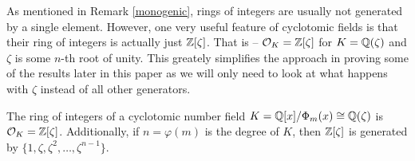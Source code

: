 As mentioned in Remark \ref{monogenic}, rings of integers are usually not generated by a single element. However, one very useful feature of cyclotomic fields is that their ring of integers is actually just $\mathbb{Z}[\zeta]$. That is -- $\mathcal{O}_K = \mathbb{Z}[\zeta]$ for $K = \mathbb{Q}(\zeta)$ and $\zeta$ is some $n$-th root of unity. This greately simplifies the approach in proving some of the results later in this paper as we will only need to look at what happens with $\zeta$ instead of all other generators.

\begin{proposition}\label{cycl-ok}
	The ring of integers of a cyclotomic number field $K = \mathbb{Q}[x]/\Phi_m(x) \cong \mathbb{Q}(\zeta)$ is $\mathcal{O}_K = \mathbb{Z}[\zeta]$. Additionally, if $n = \varphi(m)$ is the degree of $K$, then $\mathbb{Z}[\zeta]$ is generated by $\{1, \zeta, \zeta^2, \dots, \zeta^{n-1} \}$.
\end{proposition}

